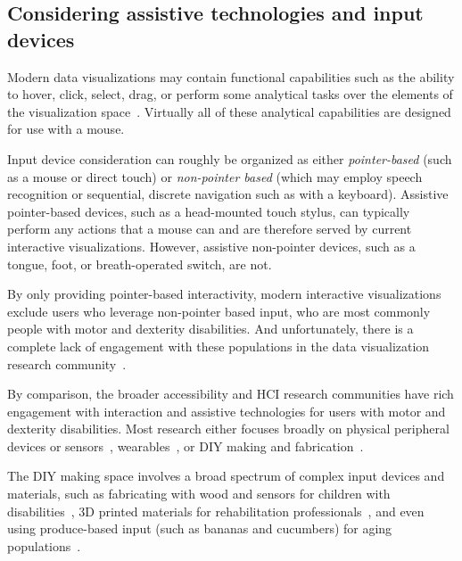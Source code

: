 \documentclass[journal]{vgtc}                %
\newcommand{\ea}{{et~al\xperiod}\xspace}
\begin{document}

\subsection{Considering assistive technologies and input devices}
Modern data visualizations may contain functional capabilities such as the ability to hover, click, select, drag, or perform some analytical tasks over the elements of the visualization space~\cite{Satyanarayan2017VegaLite}. Virtually all of these analytical capabilities are designed for use with a mouse.

Input device consideration can roughly be organized as either \textit{pointer-based} (such as a mouse or direct touch) or \textit{non-pointer based} (which may employ speech recognition or sequential, discrete navigation such as with a keyboard). Assistive pointer-based devices, such as a head-mounted touch stylus, can typically perform any actions that a mouse can and are therefore served by current interactive visualizations. However, assistive non-pointer devices, such as a tongue, foot, or breath-operated switch, are not.

By only providing pointer-based interactivity, modern interactive visualizations exclude users who leverage non-pointer based input, who are most commonly people with motor and dexterity disabilities. And unfortunately, there is a complete lack of engagement with these populations in the data visualization research community~\cite{Marriott2021Inclusive}.

By comparison, the broader accessibility and HCI research communities have rich engagement with interaction and assistive technologies for users with motor and dexterity disabilities. Most research either focuses broadly on physical peripheral devices or sensors~\cite{Siean2021}, wearables~\cite{Sarsenbayeva2022}, or DIY making and fabrication~\cite{Hurst2013Making}.

The DIY making space involves a broad spectrum of complex input devices and materials, such as fabricating with wood and sensors for children with disabilities~\cite{Lin2014}, 3D printed materials for rehabilitation professionals~\cite{Giraud2016}, and even using produce-based input (such as bananas and cucumbers) for aging populations~\cite{Rogers2014}.
\end{document}
